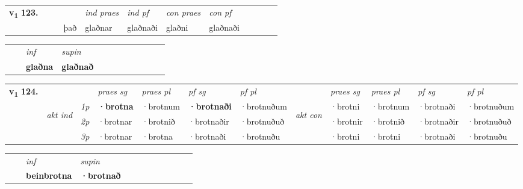 \begin{tabular}{llllllllllll}\toprule
\multirow{4}{*}{{{\textbf{v{\textsubscript{1}}} \Large{\textbf{123.}}}}}  & &  & &  \textit{ind praes} & \textit{ind pf} & \textit{con praes} & \textit{con pf} \\*
&  & & það & glaðnar & glaðnaði & glaðni & glaðnaði \\*
\cmidrule{5-9}
\end{tabular}


\begin{tabular}{llllllllllll}
 & & \textit{inf}      & \textit{supin}       \\*
  & & \textbf{glaðna}       &  \textbf{glaðnað}   \\*
\cmidrule{1-12}
\end{tabular}



\begin{tabular}{llllllllllll} \toprule
\multirow{4}{*}{{{\textbf{v{\textsubscript{1}}} \Large{\textbf{124.}}}}}  & &   &  \textit{praes sg}  & \textit{praes pl}  &\textit{ pf sg} & \textit{pf pl} &  &  \textit{praes sg}  & \textit{praes pl}  & \textit{pf sg} & \textit{pf pl } \\*
	\cmidrule{4-7} \cmidrule{9-12}
 & \multirow{3}{*}{\begin{turn}{90}\textit{akt ind}\end{turn}} & {\textit{1p}} & \textbf{·brotna} & ·brotnum    & \textbf{·brotnaði} & ·brotnuðum & \multirow{3}{*}{\begin{turn}{90}\textit{akt con}\end{turn}} &·brotni & ·brotnum & ·brotnaði & ·brotnuðum\\*
& &  {\textit{2p}} &  ·brotnar  & ·brotnið   & ·brotnaðir & ·brotnuðuð & & ·brotnir & ·brotnið & ·brotnaðir & ·brotnuðuð \\*
& &  {\textit{3p}} & ·brotnar & ·brotna   & ·brotnaði & ·brotnuðu & & ·brotni & ·brotni& ·brotnaði & ·brotnuðu  \\*
\cmidrule{4-7} \cmidrule{9-12}
\end{tabular}


\begin{tabular}{llllllllllll}
 & & \textit{inf}      & \textit{supin}       \\*
  & & \textbf{beinbrotna}       &  \textbf{·brotnað}   \\*
\cmidrule{1-12}
\end{tabular}



